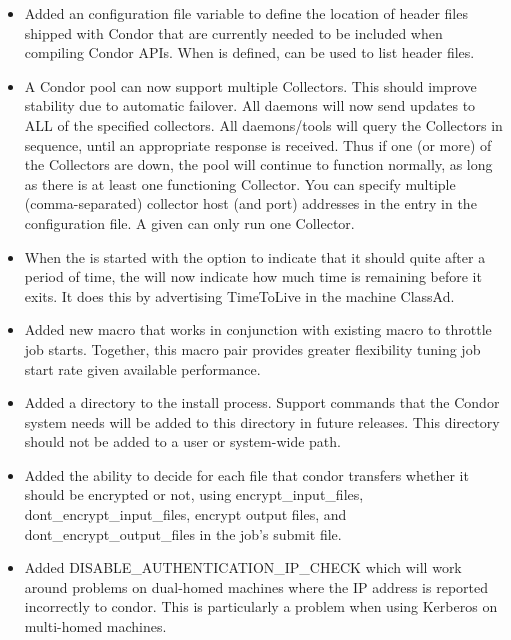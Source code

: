 \begin{itemize}

\item Added an  configuration file variable
   to define the location of header files shipped with Condor
   that are currently needed to be included when compiling
   Condor APIs.
   When  is defined,
    can be used to list header files.


\item A Condor pool can now support multiple Collectors. This should
  improve stability due to automatic failover. All daemons will now
  send updates to ALL of the specified collectors. All daemons/tools
  will query the Collectors in sequence, until an appropriate 
  response is received. Thus if one (or more) of the Collectors are 
  down, the pool will continue to function normally, as long as 
  there is at least one functioning Collector. 
  You can specify multiple (comma-separated) collector host (and port) 
  addresses in the  entry in the configuration
  file. A given  can only run one Collector.

\item When the  is started with the  option to
  indicate that it should quite after a period of time, the
   will now indicate how much time is remaining before it
  exits. It does this by advertising TimeToLive in the machine
  ClassAd.

\item Added new macro  that works in
conjunction with existing macro  to 
throttle job starts.
Together, this macro pair provides greater flexibility
tuning job start rate given available  performance.

\item Added a  directory to the install process.
Support commands that
the Condor system needs will be added to this directory in future releases.
This directory should not be added to a user or system-wide path.  

\item Added the ability to decide for each file that condor transfers whether
it should be encrypted or not, using encrypt\_input\_files, 
dont\_encrypt\_input\_files, encrypt output files, and
        dont\_encrypt\_output\_files in the job's submit file.

\item Added DISABLE\_AUTHENTICATION\_IP\_CHECK which will work around problems
on dual-homed machines where the IP address is reported incorrectly to condor.
This is particularly a problem when using Kerberos on multi-homed machines.

\end{itemize}


